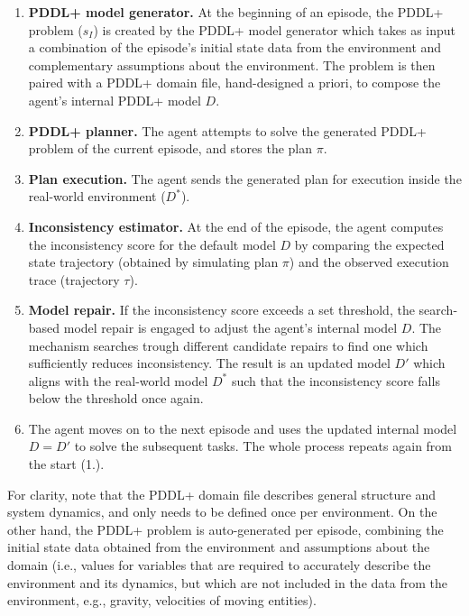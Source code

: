 \documentclass[letterpaper]{article} %
\begin{document}
\begin{enumerate}
    \item \textbf{PDDL+ model generator.} At the beginning of an episode, the PDDL+ problem ($s_I$) is created by the PDDL+ model generator which takes as input a combination of the episode's initial state data from the environment and complementary assumptions about the environment. The problem is then paired with a PDDL+ domain file, hand-designed a priori, to compose the agent's internal PDDL+ model $D$. 
    \item \textbf{PDDL+ planner.} The agent attempts to solve the generated PDDL+ problem of the current episode, and stores the plan $\pi$.
    \item \textbf{Plan execution.} The agent sends the generated plan for execution inside the real-world environment ($D^*$).
    \item \textbf{Inconsistency estimator.} At the end of the episode, the agent computes the inconsistency score for the default model $D$ by comparing the expected state trajectory (obtained by simulating plan $\pi$) and the observed execution trace (trajectory $\tau$). 
    \item \textbf{Model repair.} If the inconsistency score exceeds a set threshold, the search-based model repair is engaged to adjust the agent's internal model $D$. The mechanism searches trough different candidate repairs to find one which sufficiently reduces inconsistency. The result is an updated model $D'$ which aligns with the real-world model $D^*$ such that the inconsistency score falls below the threshold once again.
    \item The agent moves on to the next episode and uses the updated internal model $D=D'$ to solve the subsequent tasks. The whole process repeats again from the start (1.).
\end{enumerate}

For clarity, note that the PDDL+ domain file describes general structure and system dynamics, and only needs to be defined once per environment. On the other hand, the PDDL+ problem is auto-generated per episode, combining the initial state data obtained from the environment and assumptions about the domain (i.e., values for variables that are required to accurately describe the environment and its dynamics, but which are not included in the data from the environment, e.g., gravity, velocities of moving entities).
\end{document}
